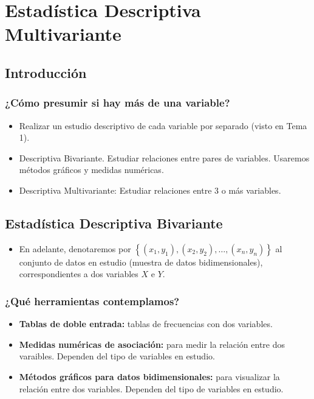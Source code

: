 \section{Estadística Descriptiva Multivariante}
\subsection{Introducción}
\subsubsection*{¿Cómo presumir si hay más de una variable?}
\begin{itemize}
	\item Realizar un estudio descriptivo de cada variable por separado (visto en Tema 1).
	\item Descriptiva Bivariante. Estudiar relaciones entre pares de variables. Usaremos métodos gráficos y medidas numéricas.
	\item Descriptiva Multivariante: Estudiar relaciones entre 3 o más variables.
\end{itemize}
\subsection{Estadística Descriptiva Bivariante}
\begin{itemize}
	\item En adelante, denotaremos por $\left\lbrace(x_1, y_1), (x_2, y_2), \hdots, (x_{n}, y_{n})\right\rbrace$ al conjunto de datos en estudio (muestra de datos bidimensionales), correspondientes a dos variables $X$ e $Y$.
\end{itemize}
\subsubsection*{¿Qué herramientas contemplamos?}
\begin{itemize}
	\item \textbf{Tablas de doble entrada:} tablas de frecuencias con dos variables.
	\item \textbf{Medidas numéricas de asociación:} para medir la relación entre dos varaibles. Dependen del tipo de variables en estudio.
	\item \textbf{Métodos gráficos para datos bidimensionales:} para visualizar la relación entre dos variables. Dependen del tipo de variables en estudio.
\end{itemize}
